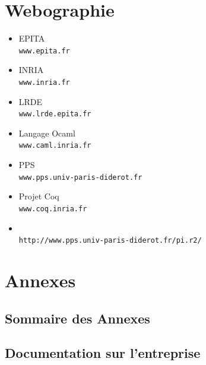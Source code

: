 \chapter{Webographie}
\begin{itemize}
\item EPITA \\
  \texttt{www.epita.fr}
\item INRIA \\
  \texttt{www.inria.fr}
\item LRDE \\
  \texttt{www.lrde.epita.fr}
\item Langage Ocaml \\
  \texttt{www.caml.inria.fr}
\item PPS \\
  \texttt{www.pps.univ-paris-diderot.fr}
\item Projet Coq \\
  \texttt{www.coq.inria.fr}
\item \pir \\
  \texttt{http://www.pps.univ-paris-diderot.fr/pi.r2/}
\end{itemize}

\chapter{Annexes}
  \section{Sommaire des Annexes}
  \minitoc
  \section{Documentation sur l'entreprise}
